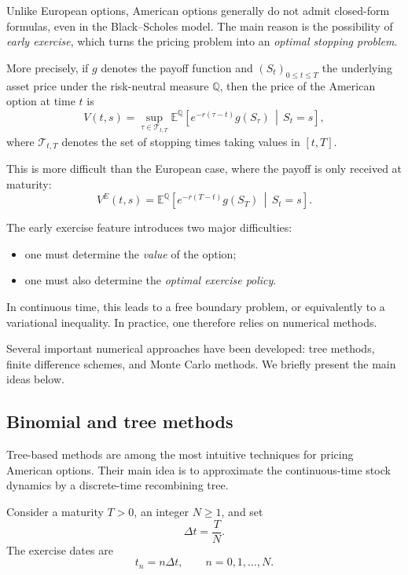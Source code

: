 \documentclass[11pt]{article}
\newcommand{\Qbb}{\mathbb{Q}}
\theoremstyle{definition}
\theoremstyle{plain}
\begin{document}
Unlike European options, American options generally do not admit
closed-form formulas, even in the Black--Scholes model.
The main reason is the possibility of \emph{early exercise}, which turns
the pricing problem into an \emph{optimal stopping problem}.

More precisely, if \(g\) denotes the payoff function and
\((S_t)_{0\le t\le T}\) the underlying asset price under the
risk-neutral measure \(\Qbb\), then the price of the American option at
time \(t\) is
\[
V(t,s)
=
\sup_{\tau \in \mathcal T_{t,T}}
\mathbb E^{\Qbb}\!\left[
e^{-r(\tau-t)} g(S_\tau)\,\middle|\, S_t=s
\right],
\]
where \(\mathcal T_{t,T}\) denotes the set of stopping times taking
values in \([t,T]\).

This is more difficult than the European case, where the payoff is only
received at maturity:
\[
V^{E}(t,s)
=
\mathbb E^{\Qbb}\!\left[
e^{-r(T-t)} g(S_T)\,\middle|\, S_t=s
\right].
\]

The early exercise feature introduces two major difficulties:
\begin{itemize}[leftmargin=1.4em]
\item one must determine the \emph{value} of the option;
\item one must also determine the \emph{optimal exercise policy}.
\end{itemize}

In continuous time, this leads to a free boundary problem, or
equivalently to a variational inequality.
In practice, one therefore relies on numerical methods.

Several important numerical approaches have been developed:
tree methods, finite difference schemes, and Monte Carlo methods.
We briefly present the main ideas below.

\subsection{Binomial and tree methods}

Tree-based methods are among the most intuitive techniques for pricing
American options.
Their main idea is to approximate the continuous-time stock dynamics by
a discrete-time recombining tree.

\medskip

Consider a maturity \(T>0\), an integer \(N\ge 1\), and set
\[
\Delta t = \frac{T}{N}.
\]
The exercise dates are
\[
t_n = n\Delta t, \qquad n=0,1,\dots,N.
\]
\end{document}
